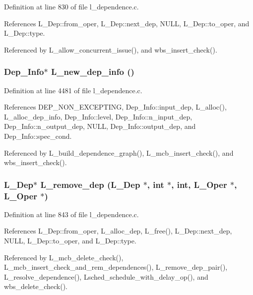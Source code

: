 Definition at line 830 of file l\_\-dependence.c.

References L\_\-Dep::from\_\-oper, L\_\-Dep::next\_\-dep, NULL, L\_\-Dep::to\_\-oper, and L\_\-Dep::type.

Referenced by L\_\-allow\_\-concurrent\_\-issue(), and wbs\_\-insert\_\-check().
\subsubsection{\setlength{\rightskip}{0pt plus 5cm}\bf{Dep\_\-Info}$\ast$ L\_\-new\_\-dep\_\-info ()}\label{l__dependence_8h_36f50b716086eefdc8b0f60e72e98f71}




Definition at line 4481 of file l\_\-dependence.c.

References DEP\_\-NON\_\-EXCEPTING, Dep\_\-Info::input\_\-dep, L\_\-alloc(), L\_\-alloc\_\-dep\_\-info, Dep\_\-Info::level, Dep\_\-Info::n\_\-input\_\-dep, Dep\_\-Info::n\_\-output\_\-dep, NULL, Dep\_\-Info::output\_\-dep, and Dep\_\-Info::spec\_\-cond.

Referenced by L\_\-build\_\-dependence\_\-graph(), L\_\-mcb\_\-insert\_\-check(), and wbs\_\-insert\_\-check().
\subsubsection{\setlength{\rightskip}{0pt plus 5cm}\bf{L\_\-Dep}$\ast$ L\_\-remove\_\-dep (\bf{L\_\-Dep} $\ast$, int $\ast$, int, L\_\-Oper $\ast$, L\_\-Oper $\ast$)}\label{l__dependence_8h_762d94e307b6c25aa78fef8b11cea19a}




Definition at line 843 of file l\_\-dependence.c.

References L\_\-Dep::from\_\-oper, L\_\-alloc\_\-dep, L\_\-free(), L\_\-Dep::next\_\-dep, NULL, L\_\-Dep::to\_\-oper, and L\_\-Dep::type.

Referenced by L\_\-mcb\_\-delete\_\-check(), L\_\-mcb\_\-insert\_\-check\_\-and\_\-rem\_\-dependences(), L\_\-remove\_\-dep\_\-pair(), L\_\-resolve\_\-dependence(), Lsched\_\-schedule\_\-with\_\-delay\_\-op(), and wbs\_\-delete\_\-check().
